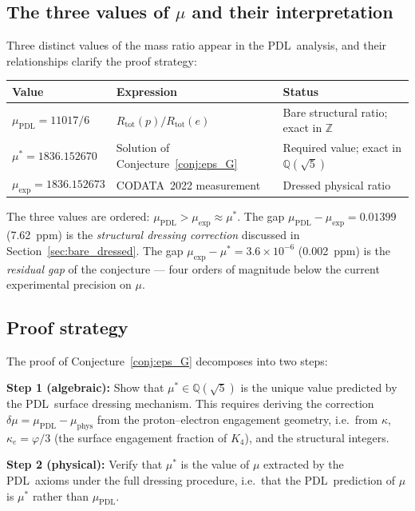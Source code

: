 \documentclass[11pt,a4paper]{article}
\theoremstyle{definition}
\newcommand{\PDL}{\textnormal{PDL}}
\newcommand{\Rtot}{R_{\mathrm{tot}}}
\newcommand{\Kfour}{K_4}
\newcommand{\vp}{\varphi}
\newcommand{\kap}{\kappa}
\newcommand{\muPDL}{\mu_{\mathrm{PDL}}}
\newcommand{\muexp}{\mu_{\mathrm{exp}}}
\newcommand{\mustar}{\mu^*}
\newcommand{\muphys}{\mu_{\mathrm{phys}}}
\begin{document}
\subsection{The three values of \texorpdfstring{$\mu$}{mu} and their interpretation}
\label{subsec:three_mu}

Three distinct values of the mass ratio appear in the \PDL\ analysis, and their relationships clarify the proof strategy:

\begin{center}
\begin{tabular}{p{3.2cm}p{4.5cm}p{5.5cm}}
\toprule
Value & Expression & Status \\
\midrule
$\muPDL = 11017/6$ & $\Rtot(p)/\Rtot(e)$ & Bare structural ratio; exact in $\mathbb{Z}$ \\
$\mustar = 1836.152670$ & Solution of Conjecture~\ref{conj:eps_G} & Required value; exact in $\mathbb{Q}(\sqrt{5})$ \\
$\muexp = 1836.152673$ & CODATA~2022 measurement & Dressed physical ratio \\
\bottomrule
\end{tabular}
\end{center}

The three values are ordered: $\muPDL > \muexp \approx \mustar$. The gap $\muPDL - \muexp = 0.01399$ (7.62~ppm) is the \emph{structural dressing correction} discussed in Section~\ref{sec:bare_dressed}. The gap $\muexp - \mustar = 3.6\times10^{-6}$ (0.002~ppm) is the \emph{residual gap} of the conjecture --- four orders of magnitude below the current experimental precision on $\mu$.

\subsection{Proof strategy}
\label{subsec:proof_strategy}

The proof of Conjecture~\ref{conj:eps_G} decomposes into two steps:

\medskip\noindent\textbf{Step 1 (algebraic):} Show that $\mustar \in \mathbb{Q}(\sqrt{5})$ is the unique value predicted by the \PDL\ surface dressing mechanism. This requires deriving the correction $\delta\mu = \muPDL - \muphys$ from the proton--electron engagement geometry, i.e.\ from $\kap$, $\kap_e = \vp/3$ (the surface engagement fraction of $\Kfour$), and the structural integers.

\medskip\noindent\textbf{Step 2 (physical):} Verify that $\mustar$ is the value of $\mu$ extracted by the \PDL\ axioms under the full dressing procedure, i.e.\ that the \PDL\ prediction of $\mu$ is $\mustar$ rather than $\muPDL$.
\end{document}
